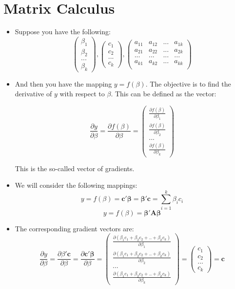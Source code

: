 \documentclass[11pt]{article}
\theoremstyle{definition}
\theoremstyle{remark}
\begin{document}
\section{Matrix Calculus}
\begin{itemize}
\item Suppose you have the following:
$$
\begin{pmatrix}
\beta_1 \\
\beta_2 \\
... \\
\beta_k
\end{pmatrix}
,
\begin{pmatrix}
c_1 \\
c_2 \\
... \\
c_k
\end{pmatrix}
,
\begin{pmatrix}
a_{11}&a_{12}&...&a_{1k} \\
a_{21}&a_{22}&...&a_{2k} \\
...&...&...&... \\
a_{k1}&a_{k2}&...&a_{kk} \\
\end{pmatrix}
$$

\item And then you have the mapping $ y = f(\beta) $. The objective is to find the derivative of $y$ with respect to $\beta$. This can be defined as the vector:

$$
\frac{\partial y}{\partial \beta} = \frac{\partial f(\beta)}{\partial \beta} = 
\begin{pmatrix}
\frac{\partial f(\beta)}{\partial \beta_1} \\
\frac{\partial f(\beta)}{\partial \beta_2} \\
... \\
\frac{\partial f(\beta)}{\partial \beta_k}
\end{pmatrix}
$$

This is the so-called vector of gradients.

\item We will consider the following mappings:
$$
y = f(\beta) = \mathbf{c'\beta = \beta'c} = \sum_{i=1}^{k} \beta_i c_i
$$
$$
y = f(\beta) = \mathbf{\beta'A\beta}
$$
\item The corresponding gradient vectors are:
$$
\frac{\partial y}{\partial \beta} = \frac{\partial \beta'\mathbf{c}}{\partial \beta} = \frac{\partial \mathbf{c'\beta}}{\partial \beta} = 
\begin{pmatrix}
\frac{\partial (\beta_1 c_1 + \beta_2 c_2 + .. + \beta_k c_k)}{\partial \beta_1} \\
\frac{\partial (\beta_1 c_1 + \beta_2 c_2 + .. + \beta_k c_k)}{\partial \beta_2} \\
... \\ 
\frac{\partial (\beta_1 c_1 + \beta_2 c_2 + .. + \beta_k c_k)}{\partial \beta_k} 
\end{pmatrix}
=
\begin{pmatrix}
c_1 \\
c_2 \\
... \\
c_k
\end{pmatrix}
= \mathbf{c}
$$


\end{itemize}
\end{document}
